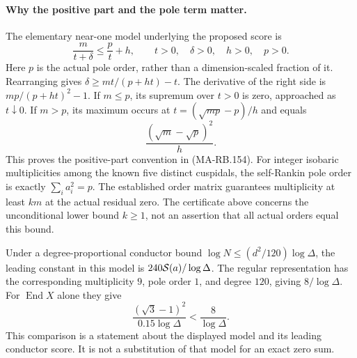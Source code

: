 \paragraph{Why the positive part and the pole term matter.}
The elementary near-one model underlying the proposed
score is
\[
       \frac{m}{t+\delta}\le\frac p t+h,
          \qquad t>0,\quad \delta>0,\quad h>0,\quad p>0.
 \tag{MA-RB.164}
\]
Here \(p\) is the actual pole order, rather than a
dimension-scaled fraction of it.  Rearranging gives
\(\delta\ge mt/(p+ht)-t\).
The derivative of the right side is
\(mp/(p+ht)^2-1\).  If \(m\le p\), its supremum
over \(t>0\) is zero, approached as \(t\downarrow0\).
If \(m>p\), its maximum occurs at
\(t=(\sqrt{mp}-p)/h\) and equals
\[
                  \frac{(\sqrt m-\sqrt p)^2}{h}.
 \tag{MA-RB.165}
\]
This proves the positive-part convention in (MA-RB.154).
For integer isobaric multiplicities among the known
five distinct cuspidals, the self-Rankin pole order
is exactly \(\sum_i a_i^2=p\).  The established order
matrix guarantees multiplicity at least \(km\) at the
actual residual zero.  The certificate above concerns
the unconditional lower bound \(k\ge1\), not an
assertion that all actual orders equal this bound.

Under a degree-proportional conductor bound
\(\log N\le(d^2/120)\log\Delta\), the leading constant
in this model is \(240{\cal S}(a)/\log\Delta\).
The regular representation has the corresponding
multiplicity \(9\), pole order \(1\), and degree \(120\),
giving \(8/\log\Delta\).
For \(\operatorname{End}X\) alone they give
\[
 \frac{(\sqrt3-1)^2}{0.15\log\Delta}
                         <\frac8{\log\Delta}.
 \tag{MA-RB.166}
\]
This comparison is a statement about the displayed
model and its leading conductor score.  It is not
a substitution of that model for an exact zero sum.

